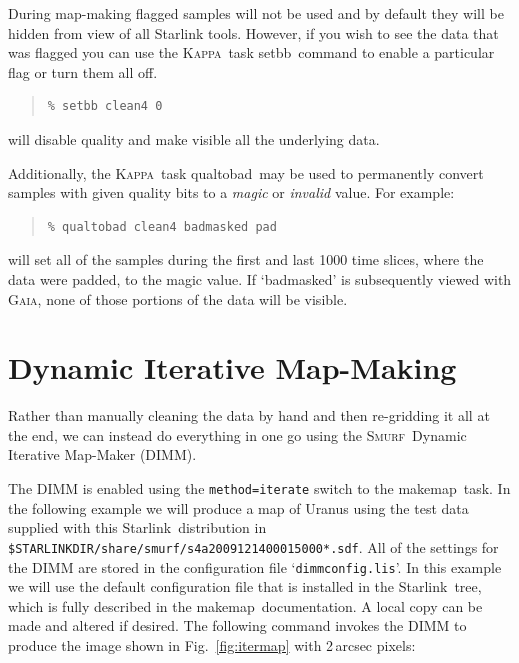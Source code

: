 \documentclass[twoside,11pt]{article}
\newcommand{\htmladdnormallink}[2]{#1}
\newcommand{\xref}[3]{#1}
\newcommand{\xlabel}[1]{}
\renewcommand{\_}{\texttt{\symbol{95}}}
\newenvironment{myquote}{\begin{quote}\begin{small}}{\end{small}\end{quote}}
\newcommand{\starlink}{\htmladdnormallink{Starlink}{http://starlink.jach.hawaii.edu}}
\newcommand{\Kappa}{\xref{\textsc{Kappa}}{sun95}{}}
\newcommand{\gaia}{\xref{\textsc{Gaia}}{sun214}{}}
\newcommand{\smurf}{\xref{\textsc{Smurf}}{sun258}{}}
\newcommand{\task}[1]{\textsf{#1}}
\newcommand{\makemap}{\xref{\task{makemap}}{sun258}{MAKEMAP}}
\newcommand{\qualtobad}{\xref{\task{qualtobad}}{sun95}{QUALTOBAD}}
\newcommand{\setbb}{\xref{\task{setbb}}{sun95}{SETBB}}
\begin{document}
During map-making flagged samples will not be used and by default they
will be hidden from view of all Starlink tools. However, if you wish
to see the data that was flagged you can use the \Kappa\ task \setbb\
command to enable a particular flag or turn them all off.

\begin{myquote}
\begin{verbatim}
% setbb clean4 0
\end{verbatim}
\end{myquote}

will disable quality and make visible all the underlying data.

Additionally, the \Kappa\ task \qualtobad\ may be used to
permanently convert samples with given quality bits to a {\em magic\/} or {\em
  invalid\/} value. For example:

\begin{myquote}
\begin{verbatim}
% qualtobad clean4 badmasked pad
\end{verbatim}
\end{myquote}
%
will set all of the samples during the first and last 1000 time
slices, where the data were padded, to the magic value.  If
`badmasked' is subsequently viewed with \gaia, none of those portions
of the data will be visible.

\section{\xlabel{maps}Dynamic Iterative Map-Making}
\label{sec:maps}

Rather than manually cleaning the data by hand and then re-gridding it
all at the end, we can instead do everything in one go using the
\smurf\ Dynamic Iterative Map-Maker (DIMM).

The DIMM is enabled using the \texttt{method=iterate} switch to the
\makemap\ task. In the following example we will produce a map of
Uranus using the test data supplied with this \starlink\ distribution
in \texttt{ \$STARLINK\_DIR/share/smurf/s4a20091214\_00015\_000*.sdf}. All
of the settings for the DIMM are stored in the configuration file
`\texttt{dimmconfig.lis}'. In this example we will use the default
configuration file that is installed in the \starlink\ tree, which is
fully described in the \makemap\ documentation. A local copy can be
made and altered if desired. The following command invokes the DIMM to
produce the image shown in Fig.~\ref{fig:itermap} with 2\,arcsec
pixels:
\end{document}
